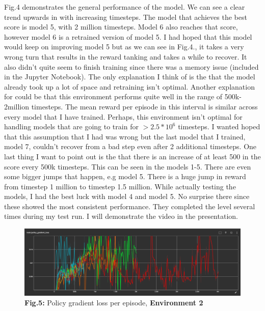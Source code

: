 \documentclass{article}
\numberwithin{equation}{section}
\numberwithin{equation}{section}
\begin{document}
Fig.4 demonstrates the general performance of the model. We can see a clear trend upwards in with increasing timesteps. The model that achieves the best score is model 5, with 2 million timesteps. Model 6 also reaches that score, however model 6 is a retrained version of model 5. I had hoped that this model would keep on improving model 5 but as we can see in Fig.4., it takes a very wrong turn that results in the reward tanking and takes a while to recover. It also didn't quite seem to finish training since there was a memory issue (included in the Jupyter Notebook). The only explanation I think of is the that the model already took up a lot of space and retraining isn't optimal. Another explanation for could be that this environment performs quite well in the range of 500k-2million timesteps. The mean reward per episode in this interval is similar across every model that I have trained. Perhaps, this environment isn't optimal for handling models that are going to train for $> 2.5 * 10^6$ timesteps. I wanted hoped that this assumption that I had was wrong but the last model that I trained, model 7, couldn't recover from a bad step even after 2 additional timesteps. One last thing I want to point out is the that there is an increase of at least 500 in the score every 500k timesteps. This can be seen in the models 1-5. There are even some bigger jumps that happen, e.g model 5. There is a huge jump in reward from timestep 1 million to timestep 1.5 million. While actually testing the models, I had the best luck with model 4 and model 5. No surprise there since these showed the most consistent performance. They completed the level several times during my test run. I will demonstrate the video in the presentation. 


\begin{figure}[H]
	\centering
\includegraphics[scale=3,width=\linewidth]{policy_loss_env2.png}
	\\	
	\vspace{0.1in}
	\textbf{Fig.5:} Policy gradient loss per episode, \textbf{Environment 2}
	\\
	\label{fig:Fig.3}
\end{figure}
\end{document}
